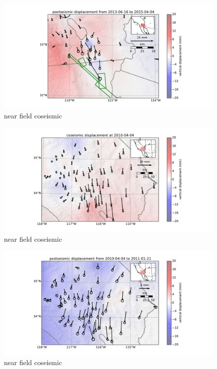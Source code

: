 \documentclass[12pt]{article}
\begin{document}
\begin{figure}
\includegraphics[scale=0.6]{Figures/near_field_data_4}
\centering 
\caption{near field coseismic}
\label{nearfield4}
\end{figure}

\begin{figure}
\includegraphics[scale=0.6]{Figures/far_field_data_1}
\centering 
\caption{near field coseismic}
\label{farfield1}
\end{figure}

\begin{figure}
\includegraphics[scale=0.6]{Figures/far_field_data_2}
\centering 
\caption{near field coseismic}
\label{farfield2}
\end{figure}
\end{document}
